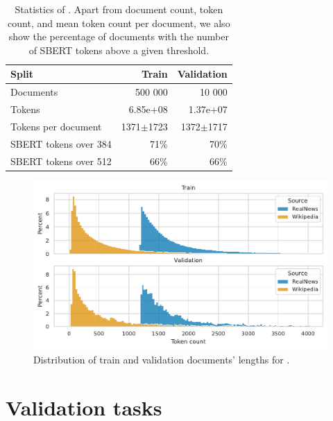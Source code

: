 \begin{table}
  \centering
  \footnotesize

  \begin{tabular}{lrr}
    \toprule
      Split & Train & Validation \\
    \midrule
      Documents & 500 000 & 10 000 \\
      Tokens & 6.85e+08 & 1.37e+07 \\
      Tokens per document & 1371$\pm$1723 & 1372$\pm$1717 \\
      SBERT tokens over 384 & 71\% & 70\% \\
      SBERT tokens over 512 & 66\% & 66\% \\
    \bottomrule
  \end{tabular}

  \caption{Statistics of . Apart from document count, token
  count, and mean token count per document, we also show the percentage of documents
  with the number of SBERT tokens above a given threshold.}

  \label{table:val_data_stats}

\end{table}

\begin{figure}

  \includegraphics[width=\textwidth]{./img/val_data_dist.pdf}

  \caption{Distribution of train and validation documents' lengths for
  .}

  \label{fig:val_data_dist}

\end{figure}

\section{Validation tasks}\label{section:validation_tasks}


